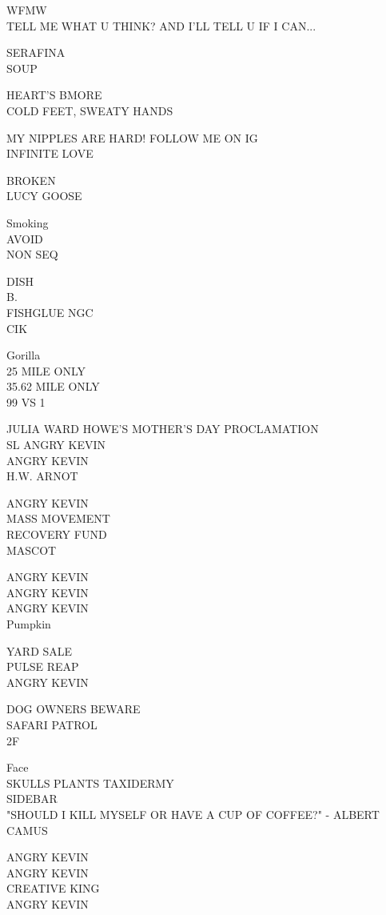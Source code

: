 \documentclass[10pt,letterpaper]{article}
\begin{document}
WFMW\\
TELL ME WHAT U THINK?  AND I'LL TELL U IF I CAN...

SERAFINA\\
SOUP

HEART'S BMORE\\
COLD FEET, SWEATY HANDS

MY NIPPLES ARE HARD!  FOLLOW ME ON IG\\
INFINITE LOVE

BROKEN\\
LUCY GOOSE

Smoking\\
AVOID\\
NON SEQ

DISH\\
B.\\
FISHGLUE NGC\\
CIK

Gorilla\\
25 MILE ONLY\\
35.62 MILE ONLY\\
99 VS 1

JULIA WARD HOWE'S MOTHER'S DAY PROCLAMATION\\
SL ANGRY KEVIN\\
ANGRY KEVIN\\
H.W. ARNOT

ANGRY KEVIN\\
MASS MOVEMENT\\
RECOVERY FUND\\
MASCOT

ANGRY KEVIN\\
ANGRY KEVIN\\
ANGRY KEVIN\\
Pumpkin

YARD SALE\\
PULSE REAP\\
ANGRY KEVIN

DOG OWNERS BEWARE\\
SAFARI PATROL\\
2F

Face\\
SKULLS PLANTS TAXIDERMY\\
SIDEBAR\\
"SHOULD I KILL MYSELF OR HAVE A CUP OF COFFEE?" {-} ALBERT CAMUS

ANGRY KEVIN\\
ANGRY KEVIN\\
CREATIVE KING\\
ANGRY KEVIN
\end{document}
